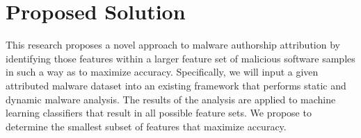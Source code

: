 \documentclass[12pt]{report}
\begin{document}
\chapter{Proposed Solution}
\label{chap:three}

This research proposes a novel approach to malware authorship attribution by identifying those features within a larger feature set of malicious software samples in such a way as to maximize accuracy.  Specifically, we will input a given attributed malware dataset into an existing framework that performs static and dynamic malware analysis.   The results of the analysis are applied to machine learning classifiers that result in all possible feature sets.  We propose to determine the smallest subset of features that maximize accuracy.  
\end{document}
